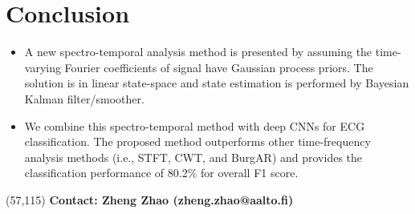 \documentclass[portrait,a0,final]{a0poster} %
\begin{document}
\begin{minipage}{0.98\linewidth}
\begin{minipage}[t]{0.47\linewidth}
\section*{Conclusion}
\setlength{\parindent}{10mm}
\begin{itemize}
	\item A new spectro-temporal analysis method is presented by assuming the time-varying Fourier coefficients of signal have Gaussian process priors. The solution is in linear state-space and state estimation is performed by Bayesian Kalman filter/smoother. 
	\item We combine this spectro-temporal method with deep CNNs for ECG classification. The proposed method outperforms other time-frequency analysis methods (i.e., STFT, CWT, and BurgAR) and provides the classification performance of 80.2\% for overall F1 score. 
\end{itemize}

\begin{textblock}{24}(57,115)
	\large \textbf{Contact: Zheng Zhao (zheng.zhao@aalto.fi)}
\end{textblock}

{\footnotesize %




} %

\end{minipage}
\end{minipage} %







%
%
%
%
%
%
%
%
%
%




\end{document}
